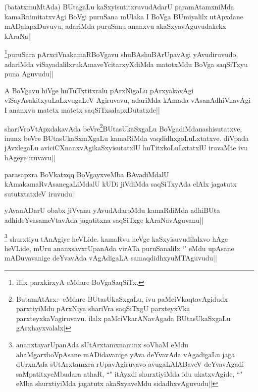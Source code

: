 \begin{artha}
(batatxmuMtAda) BUtagaLu kaSxyisutitxruvudAdarU paramAtamxniMda kamaRnimitatxvAgi BoVgi puruSana mUlaka I BoVga BUmiyalilx utApxdane mADalapxDuvuvu, adariMda puruSanu ananxvu akaSxyavAguvudakekx kAraNa||
\end{artha}

\begin{artha}
\footnote{ililx parxkirxyA eMdare BoVgaSaqSiTx.}puruSara pArxciVnakamaRBoVgavu shuBAshuBArUpavAgi yAvudiruvudo, adariMda viSayadalilxrukAmaveYcitarxyXdiMda matotxMdu BoVga saqSiTxyu puna Aguvudu||
\end{artha}

\begin{artha}
A BoVgavu hiVge huTuTxtitxralu pArxNigaLu pArxyakavAgi viSayAsakitxyuLaLxvugaLeV Agiruvavu, adariMda kAmada vAsanAdhiVnavAgi I ananxvu matetx matetx saqSiTxsalapxDutatxde||
\end{artha}

\begin{artha}
shariVroVtApxdakavAda beVre\footnote{ButamAtArx:- eMdare BUtasUkaSxgaLu, ivu paMciVkaqtavAgidudx parxtiyiMdu pArxNiya shariVra saqSiTxgU parxteyxVka parxteyxkaVagiruvavu. ilalx  paMciVkarANavAgada BUtasUkaSxgaLu gArxhayxvalalx|}BUtasUkaSxgaLu BoVgadiMdanashisutatxve, inunx beVre BUtasUkaSxmXgaLu kamaRiMda vaqdidhxgoLuLxtatxve. diVpada jAvxlegaLu aviciCXnanxvAgikaSxyisutatxlU huTitxkoLuLxtatxlU iruvaMte ivu hAgeye iruvavu||
\end{artha}

\begin{artha}
parasapxra BoVkatxqq BoVgayxveMba BAvadiMdalU kAmakamaRvAsanegaLiMdalU kUDi jiVdiMda saqSiTxyAda elAlx jagatutx sututxtatxleV iruvudu||
\end{artha}

\begin{artha}
yAvanADarU obabx jiVvanu yAvudAdaroMdu kamaRdiMda adhiBUta adhideYvasameVtavAda jagatitxna saqSiTxge kAraNavAguvanu||
\end{artha}

\begin{artha}
\footnote{ananxtayarUpanAda sUtArxtamxnanunx soV\s haM eMdu ahaMgarxhoVpAsane mADidavanige yAva deYvavAda vAgadigaLu jaga dUrxnAda sUtArxtamxra rUpavAgiruvavo avugaLAlABaveV deYvavAgadi saMpatitxyeMbudara athaR, ``\stext" itAyxdi shurxtiyiMda idu ukatxvAgide, ``\stext" eMba shurxtiyiMda jagatutx akaSxyaveMdu sidadhxvAguvudu||} shurxtiyu tAnAgiye heVLide. kamaRvu heVge kaSxyisuvudilalxvo hAge heVLide, mUru ananxsavxrUpanAda virATa puruSanalilx `\stext' eMdu upAsane mADuvavanige deYvavAda vAgAdigaLA samaqdidhxyuMTAguvudu||
\end{artha}

